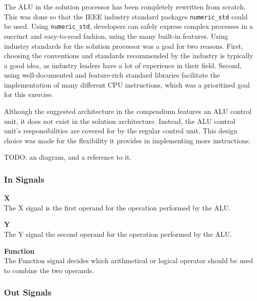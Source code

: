 The ALU in the solution processor has been completely rewritten from scratch.
This was done so that the IEEE industry standard packages \texttt{numeric\_std} could be used.
Using \texttt{numeric\_std}, developers can safely express complex processes in a succinct and easy-to-read fashion, using the many built-in features.
Using industry standards for the solution processor was a goal for two reasons.
First, choosing the conventions and standards recommended by the industry is typically a good idea, as industry leaders have a lot of experience in their field.
Second, using well-documented and feature-rich standard libraries facilitate the implementation of many different CPU instructions, which was a prioritized goal for this exercise.

Although the suggested architecture in the compendium features an ALU control unit\cite{compendium}, it does not exist in the solution architecture.
Instead, the ALU control unit's responsibilities are covered for by the regular control unit.
This design choice was made for the flexibility it provides in implementing more instructions.

TODO: an diagram, and a reference to it.

\subsubsection{In Signals}

\begin{description}
\item{\textbf{X}} \\
The X signal is the first operand for the operation performed by the ALU.

\item{\textbf{Y}} \\
The Y signal the second operand for the operation performed by the ALU.

\item{\textbf{Function}} \\
The Function signal decides which arithmetical or logical operator should be used to combine the two operands.
\end{description}

\subsubsection{Out Signals}

